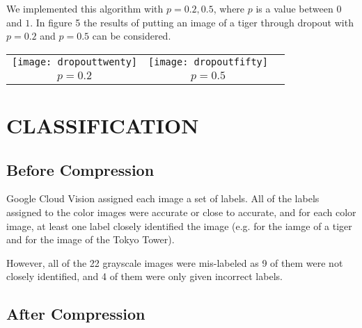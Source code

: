 We implemented this algorithm with $p=0.2,0.5$, where $p$ is a value between $0$ and $1$.
In figure 5 the results of putting an image of a tiger through dropout
with $p=0.2$ and $p=0.5$ can be considered.

\vspace*{3mm}
\begin{tabular}{c c c}
	\texttt{[image: dropouttwenty]} &
		\texttt{[image: dropoutfifty]} \\
	$p=0.2$ & $p=0.5$ \\
\end{tabular}

\vspace*{3mm}

\section{CLASSIFICATION}

\subsection{Before Compression}

Google Cloud Vision assigned each image a set of labels.
All of the labels assigned to the color images were
accurate or close to accurate, and for each color image,
at least one label closely identified the image (e.g. 
for the iamge of a tiger and  for the image of
the Tokyo Tower).

However, all of the 22 grayscale images were mis-labeled as  9 of them were not closely identified, and 4 of them
were only given incorrect labels.

\subsection{After Compression}

\vspace*{2mm}

